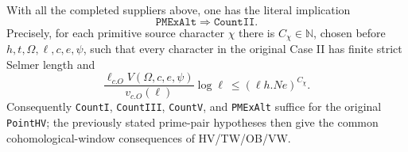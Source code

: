 \begin{theorem}
\label{claim:YX2}
With all the completed suppliers above, one has the literal
implication
\[
                         \boxed{\ \texttt{PMExAlt}
                                    \Longrightarrow\texttt{CountII}.\ }
                                                               \tag{YX.2}
\]
Precisely, for each primitive source character $\chi$ there is
$C_\chi\in\mathbb N$, chosen before
$h,t,\Omega,\ell,c,e,\psi$, such that every character in the
original Case II has finite strict Selmer length and
\[
        \frac{\ell_{c.O} V(\Omega,c,e,\psi)}{v_{c.O}(\ell)}
                    \log\ell\ \le (\ell h.N e)^{C_\chi}.
                                                               \tag{YX.3}
\]
Consequently \texttt{CountI}, \texttt{CountIII},
\texttt{CountV}, and \texttt{PMExAlt} suffice for the original
\texttt{PointHV}; the previously stated prime-pair hypotheses
then give the common cohomological-window consequences of
HV/TW/OB/VW.
\end{theorem}
